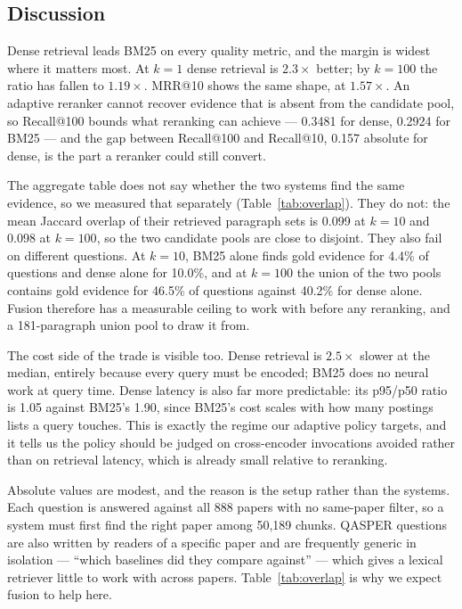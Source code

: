 \documentclass[sigconf,nonacm]{acmart}
\begin{document}
\subsection{Discussion}

Dense retrieval leads BM25 on every quality metric, and the margin is widest
where it matters most. At $k = 1$ dense retrieval is $2.3\times$ better; by
$k = 100$ the ratio has fallen to $1.19\times$. MRR@10 shows the same shape, at
$1.57\times$. An adaptive reranker cannot recover evidence that is absent from
the candidate pool, so Recall@100 bounds what reranking can achieve --- 0.3481
for dense, 0.2924 for BM25 --- and the gap between Recall@100 and Recall@10,
0.157 absolute for dense, is the part a reranker could still convert.

The aggregate table does not say whether the two systems find the same evidence,
so we measured that separately (Table~\ref{tab:overlap}). They do not: the mean
Jaccard overlap of their retrieved paragraph sets is 0.099 at $k = 10$ and 0.098
at $k = 100$, so the two candidate pools are close to disjoint. They also fail on
different questions. At $k = 10$, BM25 alone finds gold evidence for 4.4\% of
questions and dense alone for 10.0\%, and at $k = 100$ the union of the two pools
contains gold evidence for 46.5\% of questions against 40.2\% for dense alone.
Fusion therefore has a measurable ceiling to work with before any reranking, and
a 181-paragraph union pool to draw it from.

The cost side of the trade is visible too. Dense retrieval is $2.5\times$ slower
at the median, entirely because every query must be encoded; BM25 does no neural
work at query time. Dense latency is also far more predictable: its p95/p50 ratio
is 1.05 against BM25's 1.90, since BM25's cost scales with how many postings
lists a query touches. This is exactly the regime our adaptive policy targets, and
it tells us the policy should be judged on cross-encoder invocations avoided
rather than on retrieval latency, which is already small relative to reranking.

Absolute values are modest, and the reason is the setup rather than the systems.
Each question is answered against all 888 papers with no same-paper filter, so a
system must first find the right paper among 50{,}189 chunks. QASPER questions
are also written by readers of a specific paper and are frequently generic in
isolation --- ``which baselines did they compare against'' --- which gives a
lexical retriever little to work with across papers. Table~\ref{tab:overlap} is
why we expect fusion to help here.
\end{document}
